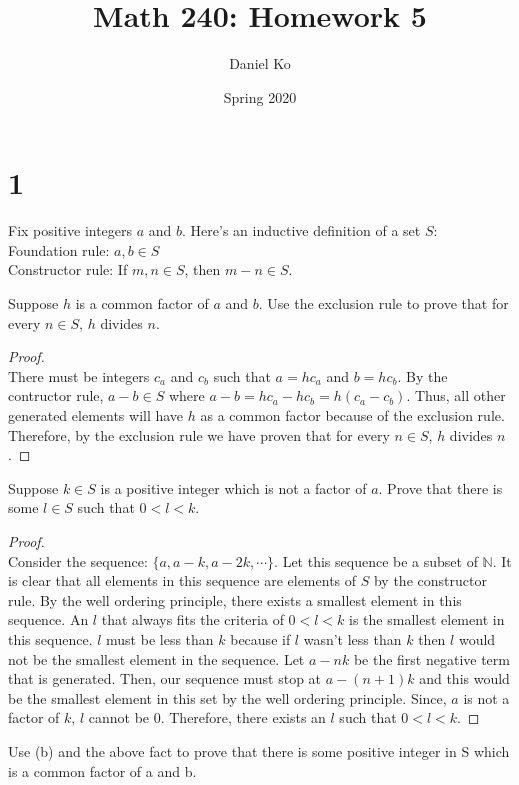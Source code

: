 \documentclass[11pt]{scrartcl}
\title{Math 240: Homework 5}
\author{Daniel Ko}
\date{Spring 2020}
\begin{document}
\maketitle

\section{1}
Fix positive integers $a$ and $b$. Here's an inductive definition of a set $S$:\\
Foundation rule: $a, b \in S$\\
Constructor rule: If $m, n \in S$, then $m - n \in S$.
\begin{enumerate}[label=\alph*.]
	\item{
			Suppose $h$ is a common factor of $a$ and $b$. Use the exclusion rule to prove that for every $n \in S$, $h$ divides $n$.
			\begin{proof}
				\-\\
				There must be integers $c_a$ and $c_b$ such that $a = hc_a$ and $b = hc_b$. By the contructor rule, 
				$a - b \in S$ where $a - b = hc_a - hc_b = h(c_a - c_b)$. Thus, all other generated elements will have $h$ as a common factor because
				of the exclusion rule. Therefore, by the exclusion rule we have proven that for every $n \in S$, $h$ divides $n$.
			\end{proof}
	\item{
			Suppose $k \in S$ is a positive integer which is not a factor of $a$. Prove that there is some $l \in S$ such that $0 < l < k$.
			\begin{proof}
			\-\\
			Consider the sequence: $\{a, a - k, a - 2k, \cdots \}$. Let this sequence be a subset of $\mathbb{N}$. 
			It is clear that all elements in this sequence are elements of $S$ by the constructor rule.
			By the well ordering principle, there exists a smallest element in this sequence. An $l$ that always fits the criteria of $0 < l < k$ is the 
			smallest element in this sequence. $l$ must be less than $k$ because if $l$ wasn't less than $k$ then $l$ would not be the smallest element in the sequence.
			Let $a - nk$ be the first negative term that is generated. Then, our sequence must stop at $a - (n + 1)k$ and this would be the smallest
			element in this set by the well ordering principle. Since, $a$ is not a factor of $k$, $l$ cannot be $0$. Therefore, there exists an $l$
			such that $0 < l < k$.
			\end{proof}
		}
	\item{
			Use (b) and the above fact to prove that there is some positive	integer in S which is a common factor of a and b.

}}
\end{enumerate}
\end{document}
